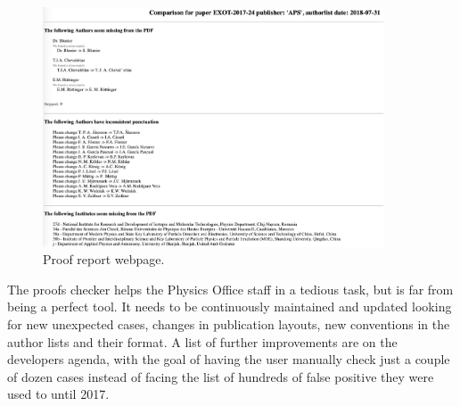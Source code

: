 \begin{figure}[htb]
  \centering
  \includegraphics[width=0.9\textwidth]{figures/proof_report_webpage.png}
  \caption{Proof report webpage.}
  \label{fig:proof_report_webpage}
\end{figure}

The proofs checker helps the Physics Office staff in a tedious task, but is far from being a perfect tool. 
It needs to be continuously maintained and updated looking for new unexpected cases,
changes in publication layouts, new conventions in the author lists and their format.
A list of further improvements are on the developers agenda,
with the goal of having the user manually check just a couple of dozen cases instead of facing the list of hundreds of false positive they were used to until 2017.
